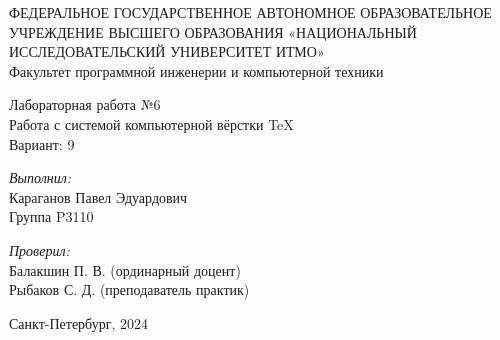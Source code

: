 \documentclass[12pt, a4pape]{article}
\begin{document}
    \begin{center}
    \Large ФЕДЕРАЛЬНОЕ ГОСУДАРСТВЕННОЕ АВТОНОМНОЕ ОБРАЗОВАТЕЛЬНОЕ УЧРЕЖДЕНИЕ ВЫСШЕГО ОБРАЗОВАНИЯ 
«НАЦИОНАЛЬНЫЙ ИССЛЕДОВАТЕЛЬСКИЙ УНИВЕРСИТЕТ ИТМО»\\
    
    Факультет программной инженерии и компьютерной техники\\
    \hfill  
    
    \vspace{7cm}
    \Large Лабораторная работа №6 \\
    Работа с системой компьютерной вёрстки \TeX\\
    Вариант: 9\\
    \end{center}
    
    \vspace{6.5cm}
     
    \begin{flushright}
    \textit{Выполнил:}\\
    Караганов Павел Эдуардович\\
    Группа P3110\
    
    \textit{Проверил:}\\
    Балакшин П. В. (ординарный доцент)\\
    Рыбаков С. Д. (преподаватель  практик)\\
    \end{flushright}
     
    \vfill
    
    \begin{center} Санкт-Петербург, 2024 \end{center}
    \newpage
\end{document}
